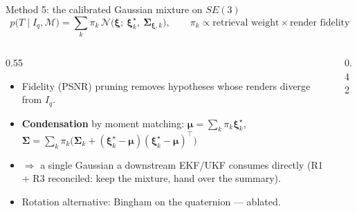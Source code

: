 \documentclass[aspectratio=169,10pt]{beamer}
\begin{document}
\begin{frame}{Method 5: the calibrated Gaussian mixture on $SE(3)$}
  \begin{equation*}
    p\big(T \mid I_q, \mathcal{M}\big)
    = \sum_k \pi_k\, \mathcal{N}\!\big(\bm\xi;\ \bm\xi_k^\star,\ \bm\Sigma_{\bm\xi,k}\big),
    \qquad \pi_k \propto \text{retrieval weight} \times \text{render fidelity}
  \end{equation*}
  \begin{columns}[T]
    \begin{column}{0.55\textwidth}
      \begin{itemize}
        \item Fidelity (PSNR) pruning removes hypotheses whose renders
              diverge from $I_q$.
        \item \textbf{Condensation} by moment matching:
              $\bm\mu = \sum_k \pi_k \bm\xi_k^\star$,\quad
              $\bm\Sigma = \sum_k \pi_k\big(\bm\Sigma_k +
              (\bm\xi_k^\star{-}\bm\mu)(\bm\xi_k^\star{-}\bm\mu)^\top\big)$
        \item $\Rightarrow$ a single Gaussian a downstream EKF/UKF consumes
              directly (R1 + R3 reconciled: keep the mixture, hand over the
              summary).
        \item Rotation alternative: Bingham on the quaternion --- ablated.
      \end{itemize}
    \end{column}
    \begin{column}{0.42\textwidth}
      \centering
    \end{column}
  \end{columns}
\end{frame}
\end{document}
